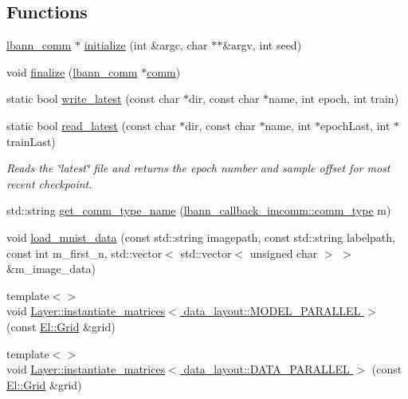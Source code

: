 \subsection*{Functions}
\begin{DoxyCompactItemize}
\item 
\hyperlink{classlbann_1_1lbann__comm}{lbann\+\_\+comm} $\ast$ \hyperlink{namespacelbann_a3d91b615e42bf5744deeed770879bc8c}{initialize} (int \&argc, char $\ast$$\ast$\&argv, int seed)
\item 
void \hyperlink{namespacelbann_a99724ee5a6647a1d8bff6764b9aa5fac}{finalize} (\hyperlink{classlbann_1_1lbann__comm}{lbann\+\_\+comm} $\ast$\hyperlink{file__io_8cpp_ab048c6f9fcbcfaa57ce68b00263dbebe}{comm})
\item 
static bool \hyperlink{namespacelbann_a35a39e949cfd1d7f8c15f94e4d44ecff}{write\+\_\+latest} (const char $\ast$dir, const char $\ast$name, int epoch, int train)
\item 
static bool \hyperlink{namespacelbann_abebab8298e56db6a455a9ed08ab42bb4}{read\+\_\+latest} (const char $\ast$dir, const char $\ast$name, int $\ast$epoch\+Last, int $\ast$train\+Last)
\begin{DoxyCompactList}\small\item\em Reads the \char`\"{}latest\char`\"{} file and returns the epoch number and sample offset for most recent checkpoint. \end{DoxyCompactList}\item 
std\+::string \hyperlink{namespacelbann_ab5665dc52c53faca0caa55b509e2e654}{get\+\_\+comm\+\_\+type\+\_\+name} (\hyperlink{classlbann_1_1lbann__callback__imcomm_acf7e894b3381e7f9b71020dc73594d6a}{lbann\+\_\+callback\+\_\+imcomm\+::comm\+\_\+type} m)
\item 
void \hyperlink{namespacelbann_a59f65281406da5bc57f49d8ec682be2d}{load\+\_\+mnist\+\_\+data} (const std\+::string imagepath, const std\+::string labelpath, const int m\+\_\+first\+\_\+n, std\+::vector$<$ std\+::vector$<$ unsigned char $>$ $>$ \&m\+\_\+image\+\_\+data)
\item 
{\footnotesize template$<$$>$ }\\void \hyperlink{namespacelbann_a32006e2c89920b1ff6e8a2318650dd7f}{Layer\+::instantiate\+\_\+matrices$<$ data\+\_\+layout\+::\+M\+O\+D\+E\+L\+\_\+\+P\+A\+R\+A\+L\+L\+E\+L $>$} (const \hyperlink{base_8hpp_a9951bb1719d534e0401b1f06cad19eab}{El\+::\+Grid} \&grid)
\item 
{\footnotesize template$<$$>$ }\\void \hyperlink{namespacelbann_af3507a38f8992e27898d63551a987341}{Layer\+::instantiate\+\_\+matrices$<$ data\+\_\+layout\+::\+D\+A\+T\+A\+\_\+\+P\+A\+R\+A\+L\+L\+E\+L $>$} (const \hyperlink{base_8hpp_a9951bb1719d534e0401b1f06cad19eab}{El\+::\+Grid} \&grid)
$$
\end{DoxyCompactItemize}
